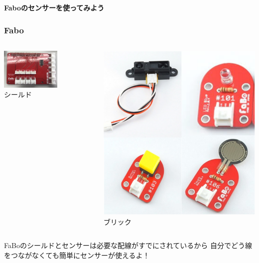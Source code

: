 \begin{frame}[plain]
    \begin{center}
        \vspace{48pt}
        {\huge\bf Faboのセンサーを使ってみよう}
    \end{center}
\end{frame}

\begin{frame}
    \frametitle{Fabo}
    \begin{center}
        \begin{columns}
            \begin{column}{0.6\textwidth}
                \includegraphics[width=0.6\textwidth]{images/chap05/text05-img004.png}
                {\\シールド}
            \end{column}
            \begin{column}{0.4\textwidth}
                \includegraphics[width=\textwidth]{images/slide/bricks.png}
                {\\ブリック}
            \end{column}
        \end{columns}
        {FaBoのシールドとセンサーは必要な配線がすでにされているから
        自分でどう線をつながなくても簡単にセンサーが使えるよ！} 
    \end{center}
\end{frame}

